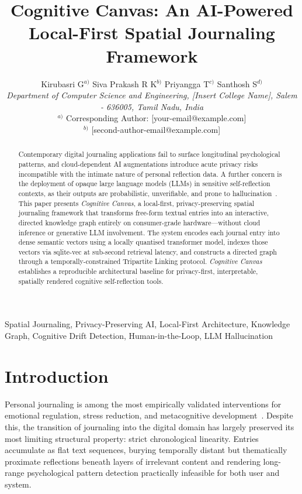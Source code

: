 \documentclass[12pt]{article}
\title{\textbf{Cognitive Canvas: An AI-Powered Local-First Spatial Journaling Framework}}
\author{
Kirubasri G$^{a)}$ Siva Prakash R K$^{b)}$ Priyangga T$^{c)}$ Santhosh S$^{d)}$ \\
\textit{Department of Computer Science and Engineering, [Insert College Name], Salem - 636005, Tamil Nadu, India} \\
$^{a)}$ Corresponding Author: [your-email@example.com] \\
$^{b)}$ [second-author-email@example.com]
}
\newcommand{\CC}{\textit{Cognitive Canvas}}
\begin{document}
\maketitle

\begin{abstract}
Contemporary digital journaling applications fail to surface longitudinal psychological patterns, and cloud-dependent AI augmentations introduce acute privacy risks incompatible with the intimate nature of personal reflection data. A further concern is the deployment of opaque large language models (LLMs) in sensitive self-reflection contexts, as their outputs are probabilistic, unverifiable, and prone to hallucination~\cite{ji2023hallucination}. This paper presents \CC{}, a local-first, privacy-preserving spatial journaling framework that transforms free-form textual entries into an interactive, directed knowledge graph entirely on consumer-grade hardware---without cloud inference or generative LLM involvement. The system encodes each journal entry into dense semantic vectors using a locally quantised transformer model, indexes those vectors via sqlite-vec at sub-second retrieval latency, and constructs a directed graph through a temporally-constrained Tripartite Linking protocol. \CC{} establishes a reproducible architectural baseline for privacy-first, interpretable, spatially rendered cognitive self-reflection tools.
\end{abstract}

\begin{IEEEkeywords}
Spatial Journaling, Privacy-Preserving AI, Local-First Architecture, Knowledge Graph, Cognitive Drift Detection, Human-in-the-Loop, LLM Hallucination
\end{IEEEkeywords}

\section{Introduction}

Personal journaling is among the most empirically validated interventions for emotional regulation, stress reduction, and metacognitive development~\cite{pennebaker1997,smyth1998}. Despite this, the transition of journaling into the digital domain has largely preserved its most limiting structural property: strict chronological linearity. Entries accumulate as flat text sequences, burying temporally distant but thematically proximate reflections beneath layers of irrelevant content and rendering long-range psychological pattern detection practically infeasible for both user and system. 
\end{document}
